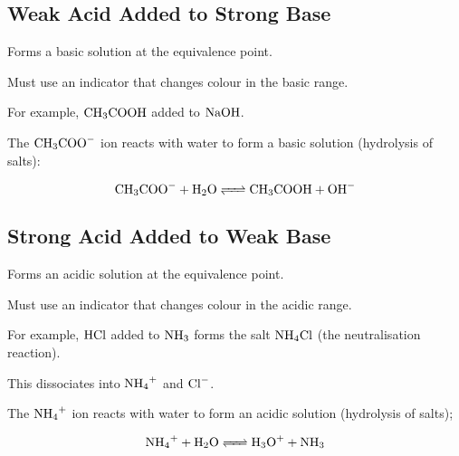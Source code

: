 \documentclass[a4paper,11pt]{article}
\begin{document}
\subsection{Weak Acid Added to Strong Base}

Forms a basic solution at the equivalence point.

Must use an indicator that changes colour in the basic range.

For example, $\ce{CH3COOH}$ added to $\ce{NaOH}$.

The $\ce{CH3COO-}$ ion reacts with water to form a basic solution (hydrolysis
of salts):

$$
\ce{CH3COO- + H2O <=> CH3COOH + OH-}
$$


\subsection{Strong Acid Added to Weak Base}

Forms an acidic solution at the equivalence point.

Must use an indicator that changes colour in the acidic range.

For example, $\ce{HCl}$ added to $\ce{NH3}$ forms the salt $\ce{NH4Cl}$ (the
neutralisation reaction).

This dissociates into $\ce{NH4+}$ and $\ce{Cl-}$.

The $\ce{NH4+}$ ion reacts with water to form an acidic solution (hydrolysis
of salts);

$$
\ce{NH4+ + H2O <=> H3O+ + NH3}
$$
\end{document}
